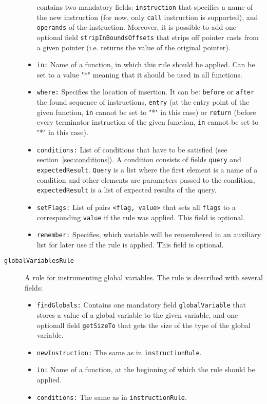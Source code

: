 \begin{description}
\begin{itemize}
    contains two mandatory fields: \texttt{instruction} that specifies a name
    of the new instruction (for now, only \texttt{call} instruction is
    supported), and \texttt{operands} of the instruction. Moreover, it is
    possible to add one optional field \texttt{stripInBoundsOffsets} that
    strips off pointer casts from a given pointer (i.e. returns the value of
    the original pointer).
    \item \texttt{in:} Name of a function, in which this rule should be
    applied. Can be set to a value "*" meaning that it should be used in all
    functions.
    \item \texttt{where:} Specifies the location of insertion. It can be:
      \texttt{before} or \texttt{after} the found sequence of instructions,
      \texttt{entry} (at the entry point of the given function, \texttt{in}
      cannot be set to "*" in this case) or \texttt{return} (before every
      terminator instruction of the given function, \texttt{in} cannot be set to
      "*" in this case).
    \item \texttt{conditions:} List of conditions that have to be satisfied
    (see section~\ref{sec:conditions}). A condition consists of fields
    \texttt{query} and \texttt{expectedResult}. \texttt{Query} is a list
    where the first element is a name of a condition and other elements are
    parameters passed to the condition, \texttt{expectedResult} is a list of
    expected results of the query.
    \item \texttt{setFlags:} List of pairs \texttt{<flag, value>} that sets
      all \texttt{flags} to a corresponding \texttt{value} if the rule was
      applied. This field is optional.
    \item \texttt{remember:} Specifies, which variable will be remembered in an
    auxiliary list for later use if the rule is applied. This field is optional.

  \end{itemize}
\item[\texttt{globalVariablesRule}] A rule for instrumenting global
  variables. The rule is described with several fields:
  \begin{itemize}
    \item \texttt{findGlobals:} Contains one mandatory field
    \texttt{globalVariable} that stores a value of a global variable to the
    given variable, and one optionall field \texttt{getSizeTo} that gets the
    size of the type of the global variable.
    \item \texttt{newInstruction:} The same as in \texttt{instructionRule}.
    \item \texttt{in:} Name of a function, at the beginning of which the rule
    should be applied.
    \item \texttt{conditions:} The same as in \texttt{instructionRule}.

  \end{itemize}

\end{description}

